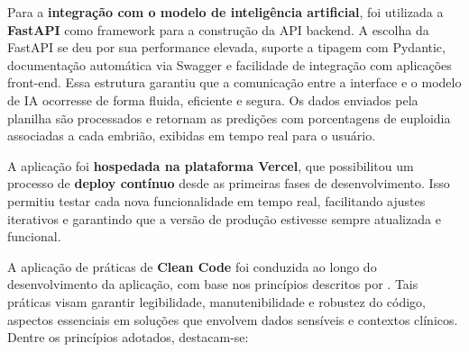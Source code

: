 Para a \textbf{integração com o modelo de inteligência artificial}, foi utilizada a \textbf{FastAPI} como framework para a construção da API backend. A escolha da FastAPI se deu por sua performance elevada, suporte a tipagem com Pydantic, documentação automática via Swagger e facilidade de integração com aplicações front-end. Essa estrutura garantiu que a comunicação entre a interface e o modelo de IA ocorresse de forma fluida, eficiente e segura. Os dados enviados pela planilha são processados e retornam as predições com porcentagens de euploidia associadas a cada embrião, exibidas em tempo real para o usuário.

A aplicação foi \textbf{hospedada na plataforma Vercel}, que possibilitou um processo de \textbf{deploy contínuo} desde as primeiras fases de desenvolvimento. Isso permitiu testar cada nova funcionalidade em tempo real, facilitando ajustes iterativos e garantindo que a versão de produção estivesse sempre atualizada e funcional.

A aplicação de práticas de \textbf{Clean Code} foi conduzida ao longo do desenvolvimento da aplicação, com base nos princípios descritos por . Tais práticas visam garantir legibilidade, manutenibilidade e robustez do código, aspectos essenciais em soluções que envolvem dados sensíveis e contextos clínicos. Dentre os princípios adotados, destacam-se:

